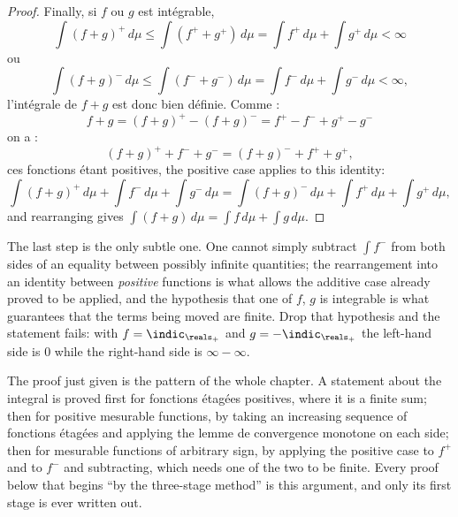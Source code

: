 \begin{proof}
  Finally, si $f$ ou $g$ est intégrable,
  \[
    \int (f+g)^{+} \, d\mu \leq \int (f^{+} + g^{+}) \, d\mu
    = \int f^{+} \, d\mu + \int g^{+} \, d\mu < \infty
  \]
  ou
  \[
    \int (f+g)^{-} \, d\mu \leq \int (f^{-} + g^{-}) \, d\mu
    = \int f^{-} \, d\mu + \int g^{-} \, d\mu < \infty ,
  \]
  l'intégrale de $f+g$ est donc bien définie. Comme :
  \[
    f + g = (f+g)^{+} - (f+g)^{-} = f^{+} - f^{-} + g^{+} - g^{-}
  \]
  on a :
  \[
    (f+g)^{+} + f^{-} + g^{-} = (f+g)^{-} + f^{+} + g^{+} ,
  \]
  ces fonctions étant positives, the positive case applies to this identity:
  \[
    \int (f+g)^{+} \, d\mu + \int f^{-} \, d\mu + \int g^{-} \, d\mu
    = \int (f+g)^{-} \, d\mu + \int f^{+} \, d\mu + \int g^{+} \, d\mu ,
  \]
  and rearranging gives $\int (f+g) \, d\mu = \int f \, d\mu + \int g \, d\mu$.
\end{proof}

\begin{remark}
  The last step is the only subtle one. One cannot simply subtract $\int f^{-}$ from
  both sides of an equality between possibly infinite quantities; the rearrangement
  into an identity between \emph{positive} functions is what allows the additive case
  already proved to be applied, and the hypothesis that one of $f$, $g$ is integrable
  is what guarantees that the terms being moved are finite. Drop that hypothesis and
  the statement fails: with $f = \indic_{\reals_{+}}$ and $g = -\indic_{\reals_{+}}$
  the left-hand side is $0$ while the right-hand side is $\infty - \infty$.
\end{remark}

\begin{remark}
  The proof just given is the pattern of the whole chapter. A statement about the
  integral is proved first for fonctions étagées positives, where it is a finite
  sum; then for positive mesurable functions, by taking an increasing sequence of
  fonctions étagées and applying the lemme de convergence monotone on each side; then
  for mesurable functions of arbitrary sign, by applying the positive case to $f^{+}$
  and to $f^{-}$ and subtracting, which needs one of the two to be finite. Every
  proof below that begins ``by the three-stage method'' is this argument, and only
  its first stage is ever written out.
\end{remark}

